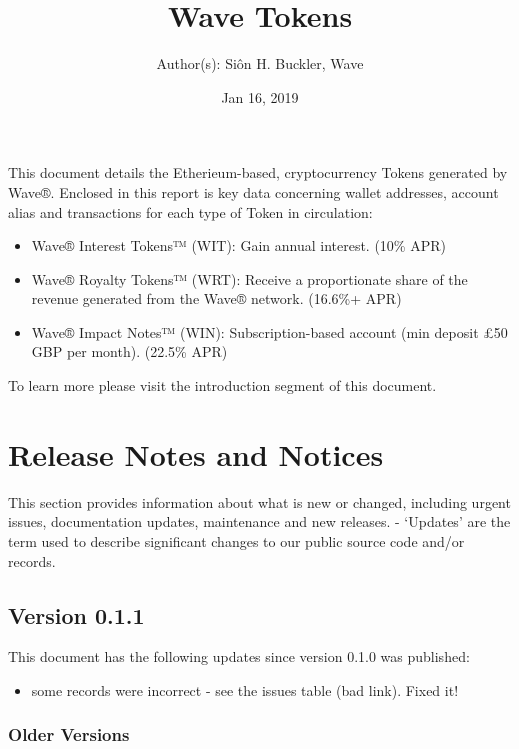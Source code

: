 \documentclass[letterpaper,10pt,english]{sphinxmanual}
\title{Wave Tokens}
\date{Jan 16, 2019}
\author{Author(s): Siôn H. Buckler, Wave}
\begin{document}
\maketitle
\sphinxtableofcontents
{}\label{\detokenize{index::doc}}


This document details the Etherieum-based, cryptocurrency Tokens generated by Wave®.
Enclosed in this report is key data concerning wallet addresses, account alias and transactions for each type of Token in circulation:
\begin{itemize}
\item {} 
Wave® Interest Tokens™ (WIT): Gain annual interest. (10\% APR)

\item {} 
Wave® Royalty Tokens™ (WRT): Receive a proportionate share of the revenue generated from the Wave® network. (16.6\%+ APR)

\item {} 
Wave® Impact Notes™ (WIN): Subscription-based account (min deposit £50 GBP per month). (22.5\% APR)

\end{itemize}

To learn more please visit the introduction segment of this document.


\chapter{Release Notes and Notices}
\label{\detokenize{releasenotes:release-notes-and-notices}}\label{\detokenize{releasenotes::doc}}
This section provides information about what is new or changed, including urgent issues, documentation updates, maintenance and new releases.
- ‘Updates’ are the term used to describe significant changes to our public source code and/or records.


\section{Version 0.1.1}
\label{\detokenize{releasenotes:version-0-1-1}}
This document has the following updates since version 0.1.0 was published:
\begin{itemize}
\item {} 
some records were incorrect - see the issues table (bad link). Fixed it!

\end{itemize}


\subsection{Older Versions}
\label{\detokenize{releasenotes:older-versions}}
\end{document}
